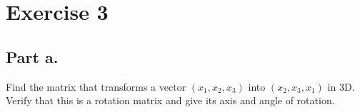 \section{Exercise 3}
\subsection{Part a.}
Find the matrix that transforms a vector $(x_{1}, x_{2}, x_{3})$ into 
$(x_{2}, x_{3}, x_{1})$ in 3D. Verify that this is a rotation matrix and
give its axis and angle of rotation.
